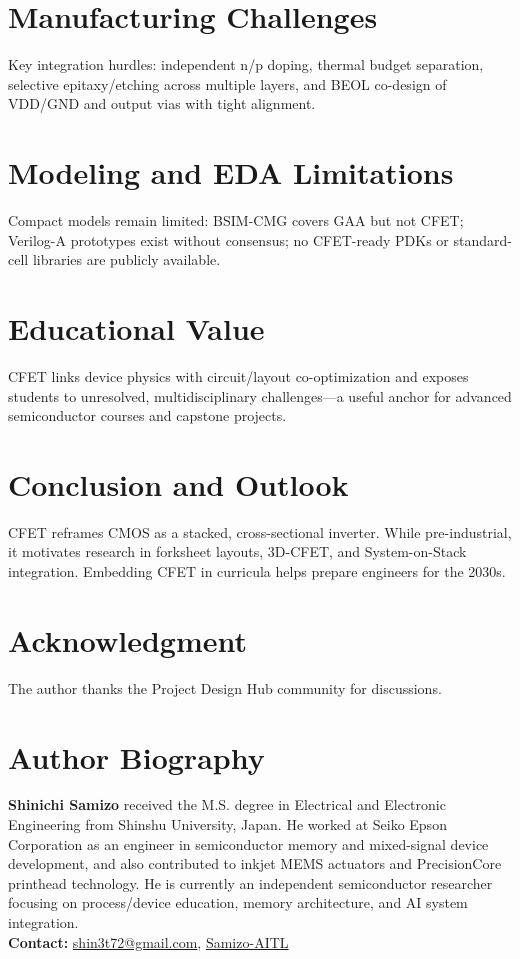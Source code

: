 \documentclass[conference]{IEEEtran}
\begin{document}
\section{Manufacturing Challenges}
Key integration hurdles: independent n/p doping, thermal budget separation, selective epitaxy/etching across multiple layers, and BEOL co-design of VDD/GND and output vias with tight alignment.

\section{Modeling and EDA Limitations}
Compact models remain limited: BSIM-CMG covers GAA but not CFET; Verilog-A prototypes exist without consensus; no CFET-ready PDKs or standard-cell libraries are publicly available.\nocite{*}

\section{Educational Value}
CFET links device physics with circuit/layout co-optimization and exposes students to unresolved, multidisciplinary challenges---a useful anchor for advanced semiconductor courses and capstone projects.

\section{Conclusion and Outlook}
CFET reframes CMOS as a stacked, cross-sectional inverter.
While pre-industrial, it motivates research in forksheet layouts, 3D-CFET, and System-on-Stack integration.
Embedding CFET in curricula helps prepare engineers for the 2030s.

\section*{Acknowledgment}
The author thanks the Project Design Hub community for discussions.




\section*{Author Biography}
\noindent\textbf{Shinichi Samizo}
received the M.S. degree in Electrical and Electronic Engineering from Shinshu University, Japan.
He worked at Seiko Epson Corporation as an engineer in semiconductor memory and mixed-signal device development, and also contributed to inkjet MEMS actuators and PrecisionCore printhead technology.
He is currently an independent semiconductor researcher focusing on process/device education, memory architecture, and AI system integration.\\[2pt]
\textbf{Contact:} \href{mailto:shin3t72@gmail.com}{shin3t72@gmail.com}, \href{https://github.com/Samizo-AITL}{Samizo-AITL}
\end{document}
